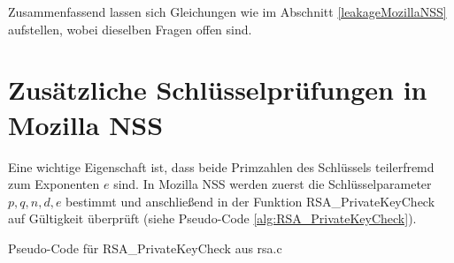 Zusammenfassend lassen sich Gleichungen wie im Abschnitt \ref{leakageMozillaNSS} aufstellen, wobei dieselben Fragen offen sind.






\section{Zusätzliche Schlüsselprüfungen in Mozilla NSS}
\label{RSAGenGCDAttack}

Eine wichtige Eigenschaft ist, dass beide Primzahlen des Schlüssels teilerfremd zum Exponenten $e$ sind.
In Mozilla NSS werden zuerst die Schlüsselparameter $p,q,n,d,e$ bestimmt und anschließend in der Funktion RSA_PrivateKeyCheck auf Gültigkeit überprüft (siehe Pseudo-Code \ref{alg:RSA_PrivateKeyCheck}).

\begin{algorithm}[h]
\DontPrintSemicolon
\caption{Pseudo-Code für RSA_PrivateKeyCheck aus rsa.c}
\label{alg:RSA_PrivateKeyCheck}

\end{algorithm}


%

